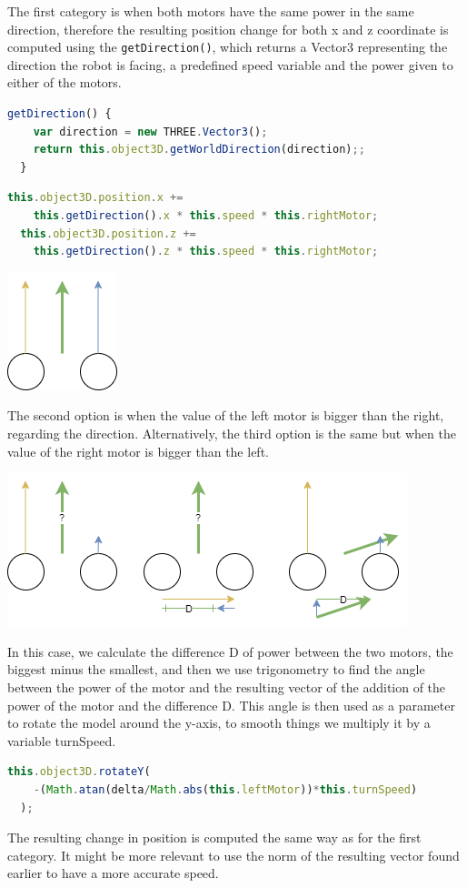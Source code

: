 \documentclass{scrbook}
\begin{document}
The first category is when both motors have the same power in the same direction, therefore the resulting position change for both x and z coordinate is computed using the \texttt{getDirection()}, which returns 
a Vector3 representing the direction the robot is facing, a predefined speed variable and the power given to either of the motors.
\begin{lstlisting}[language=JavaScript, basicstyle=\ttfamily\small]
  getDirection() {
    var direction = new THREE.Vector3();
    return this.object3D.getWorldDirection(direction);;
  }
\end{lstlisting} 
\begin{lstlisting}[language=JavaScript, basicstyle=\ttfamily\small]
  this.object3D.position.x += 
    this.getDirection().x * this.speed * this.rightMotor;
  this.object3D.position.z +=
    this.getDirection().z * this.speed * this.rightMotor;
\end{lstlisting}  
\begin{center}
  \includegraphics[scale=0.8]{./move_spsd}
\end{center}

The second option is when the value of the left motor is bigger than the right, regarding the direction. Alternatively, the third option is the same but when the value of the right motor is bigger than the left.
\begin{center}
  \includegraphics[width=\textwidth]{./move_dp}
\end{center}
In this case, we calculate the difference D of power between the two motors, the biggest minus the smallest, and then we use trigonometry to find the angle between the power of the motor and the resulting vector of the addition of the power of the motor and the difference D.
This angle is then used as a parameter to rotate the model around the y-axis, to smooth things we multiply it by a variable turnSpeed.  
\begin{lstlisting}[language=JavaScript, basicstyle=\ttfamily\small]
  this.object3D.rotateY(
    -(Math.atan(delta/Math.abs(this.leftMotor))*this.turnSpeed)
  );
\end{lstlisting} 
The resulting change in position is computed the same way as for the first category. It might be more relevant to use the norm of the resulting vector 
found earlier to have a more accurate speed.
\end{document}
